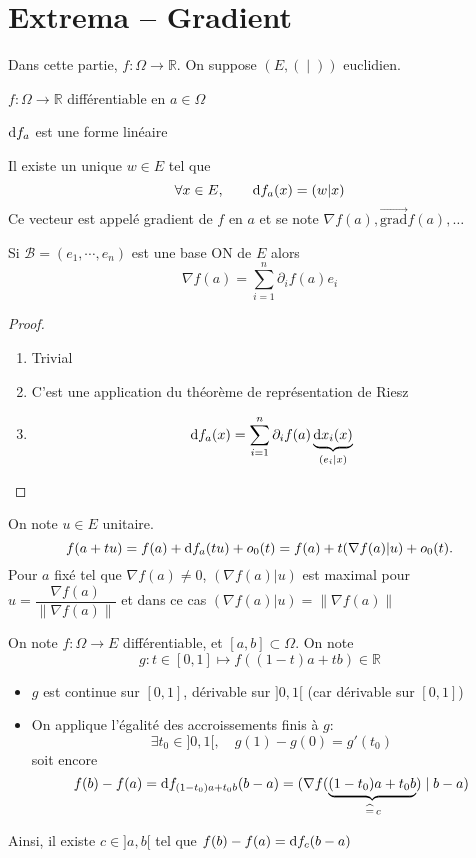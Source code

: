 \section{Extrema -- Gradient}

Dans cette partie, $f:\Omega\to\mathbb R$. On suppose $(E, (\;|\;))$ euclidien.

\begin{thmdef}
    \Hyp $f:\Omega\to\mathbb R$ différentiable en $a\in\Omega$
    \begin{concenum}
    \item $\mathrm{d} f_a$ est une forme linéaire
    \item Il existe un unique $w\in E$ tel que \[
            \forall x\in E, \qquad \mathrm{d} f_a(x)=(w|x)
        \]
        Ce vecteur est appelé gradient de $f$ en $a$ et se note $\nabla f(a), \overrightarrow{\mathrm{grad}} f(a), \dots$
    \item Si $\mathcal B=(e_1, \cdots, e_n)$ est une base ON de $E$ alors \[
            \nabla f(a)=\sum_{i=1}^n\partial_i f(a)e_i
        \]
    \end{concenum}
\end{thmdef}

\begin{proof}~
    \begin{enumerate}
        \item Trivial
        \item C'est une application du théorème de représentation de Riesz
        \item \[
                \mathrm{d} f_a(x)=\sum_{i=1}^n\partial_if(a)\underbrace{\mathrm{d} x_i(x)}_{(e_i|x)}
            \]
    \end{enumerate}
\end{proof}

\begin{rem}
    On note $u\in E$ unitaire. \[ f(a+tu)=f(a)+\mathrm{d} f_a(tu)+o_0(t)=f(a)+t (\nabla f(a)|u) +o_0(t).\] Pour $a$ fixé tel que $\nabla f(a)\neq 0$, $(\nabla f(a)|u)$ est maximal pour $u=\dfrac{\nabla f(a)}{\|\nabla f(a)\|}$ et dans ce cas $(\nabla f(a)|u)=\|\nabla f(a)\|$
\end{rem}

\begin{rem}
    On note $f:\Omega\to E$ différentiable, et $[a, b]\subset \Omega$. On note \[ g:t\in[0, 1]\longmapsto f((1-t)a+tb)\in\mathbb R \]
    \begin{itemize}
        \item $g$ est continue sur $[0, 1]$, dérivable sur $]0, 1[$ (car dérivable sur $[0, 1]$)
        \item On applique l'égalité des accroissements finis à $g$: \[
                \exists t_0\in ]0, 1[, \quad g(1)-g(0)=g'(t_0)
            \]
            soit encore \[
                f(b)-f(a)=\mathrm{d} f_{(1-t_0)a+t_0b}(b-a)=(\nabla f(\underbrace{(1-t_0)a+t_0b}_{\,\widehat=\, c})\;|\;b-a)
            \]
    \end{itemize}
    Ainsi, il existe $c\in ]a, b[$ tel que $f(b)-f(a)=\mathrm{d} f_c(b-a)$
\end{rem}

